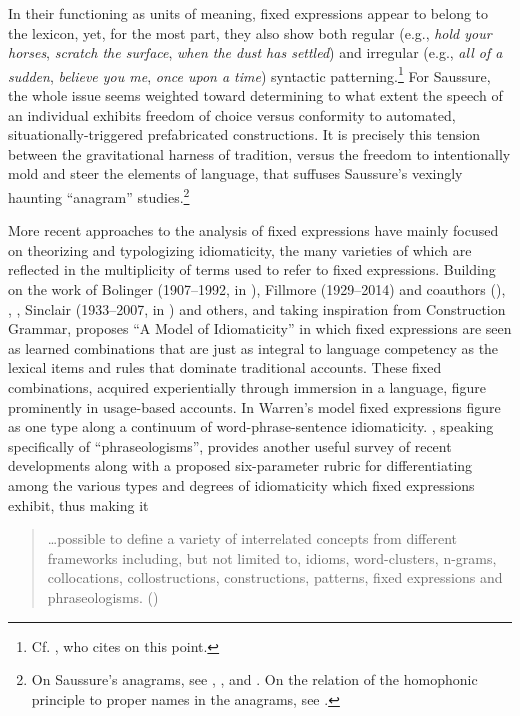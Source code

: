 \documentclass[english,output=paper,colorlinks,citecolor=brown]{../langscibook}
\begin{document}
In their functioning as units of meaning, fixed expressions appear to belong to the lexicon, yet, for the most part, they also show both regular (e.g., \textit{hold your horses}, \textit{scratch the surface}, \textit{when the dust has settled}) and irregular (e.g., \textit{all of a sudden}, \textit{believe you me}, \textit{once upon a time}) syntactic patterning.\footnote{Cf. \citet[2--3]{Wood2002}, who cites \citet[36]{RichardsSchmidt1983} on this point.} For Saussure, the whole issue seems weighted toward determining to what extent the speech of an individual exhibits freedom of choice versus conformity to automated, situationally-triggered prefabricated constructions. It is precisely this tension between the gravitational harness of tradition, versus the freedom to intentionally mold and steer the elements of language, that suffuses Saussure’s vexingly haunting ``anagram'' studies.\footnote{On Saussure's anagrams, see \citet{Christy2007}, \citet{Christy1999Blunder}, \citet{Christy1999Intellect} and \citet{CarrEtAl1999}. On the relation of the homophonic principle to proper names in the anagrams, see \citet{Christy1995}.}

More recent approaches to the analysis of fixed expressions have mainly focused  on theorizing and typologizing idiomaticity, the many varieties of which are reflected in the multiplicity of terms used to refer to fixed expressions. Building on the work of Bolinger (1907--1992, in \citealt{Bolinger1976}), Fillmore (1929--2014) and coauthors (\citeyear{FillmoreEtAl1988}), \citet{Makkai1972}, \citet{RichardsSchmidt1983}, Sinclair (1933--2007, in \citealt{Sinclair1991}) and others, and taking inspiration from Construction Grammar, \citet{Warren2005} proposes “A Model of Idiomaticity” in which fixed expressions are seen as learned combinations that are just as integral to language competency as the lexical items and rules that dominate traditional accounts. These fixed combinations, acquired experientially through immersion in a language, figure prominently in usage-based accounts. In Warren’s model fixed expressions figure as one type along a continuum of word-phrase-sentence idiomaticity. \citet{Gries2008}, speaking specifically of ``phraseologisms'', provides another useful survey of recent developments along with a proposed six-parameter rubric for differentiating among the various types and degrees of idiomaticity which fixed expressions exhibit, thus making it

\begin{quote}
    …possible to define a variety of interrelated concepts from different frameworks including, but not limited to, idioms, word-clusters, n-grams, collocations, collostructions, constructions, patterns, fixed expressions and phraseologisms. (\citealt[21]{Gries2008})
\end{quote}
\end{document}
